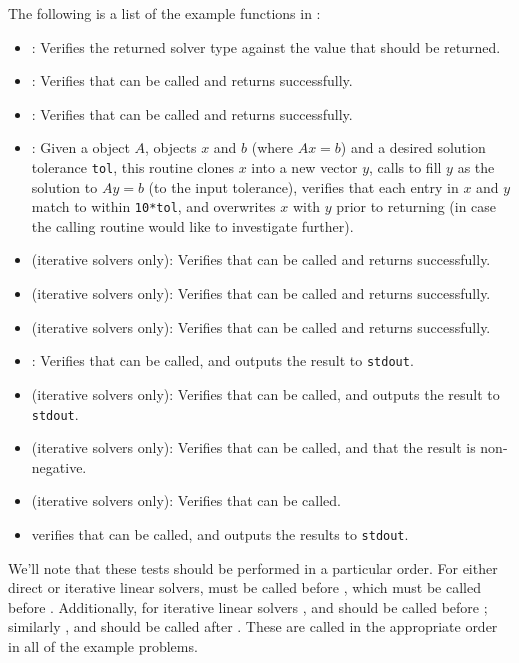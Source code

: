 \noindent The following is a list of the example functions in :
\begin{itemize}
\item {}: Verifies the returned solver type against
  the value that should be returned.
\item {}: Verifies that  
  can be called and returns successfully. 
\item {}: Verifies that  can
  be called and returns successfully. 
\item {}: Given a {\sunmatrix} object $A$,
  {\nvector} objects $x$ and $b$ (where $Ax=b$) and a desired solution
  tolerance \texttt{tol}, this routine clones $x$ into a new vector $y$,
  calls  to fill $y$ as the solution to $Ay=b$ (to
  the input tolerance), verifies that each entry in $x$ and $y$
  match to within \texttt{10*tol}, and overwrites $x$ with $y$ prior
  to returning (in case the calling routine would like to investigate
  further).
\item {} (iterative solvers only): Verifies that
   can be called and returns successfully.
\item {} (iterative solvers only):
  Verifies that  can be called and
  returns successfully.
\item {} (iterative solvers only):  
  Verifies that  can be called and
  returns successfully.
\item {}: Verifies that  can
  be called, and outputs the result to \texttt{stdout}.
\item {} (iterative solvers only): Verifies that
   can be called, and outputs the result to 
  \texttt{stdout}. 
\item {} (iterative solvers only): Verifies that
   can be called, and that the result is
  non-negative. 
\item {} (iterative solvers only): Verifies that
   can be called.
\item {} verifies that  can be
  called, and outputs the results to \texttt{stdout}.
\end{itemize}
We'll note that these tests should be performed in a particular
order.  For either direct or iterative linear
solvers,  must be called
before , which must be called
before .  Additionally, for iterative linear
solvers , 
and  should be called
before ;
similarly , 
and  should be called
after .  These are called in the appropriate
order in all of the example problems.

